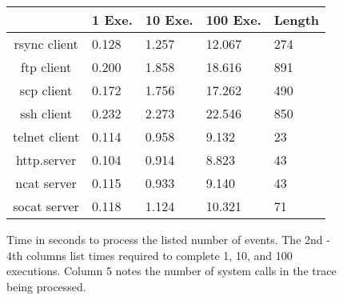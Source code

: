 \begin{figure}[t]
\centering
  \begin{tabular}{|c|l|l|l|l}
                & 1 Exe. & 10 Exe. & 100 Exe. & Length\\
              \hline
  rsync client  & 0.128       & 1.257         & 12.067         & 274 \\
  ftp client    & 0.200       & 1.858         & 18.616         & 891 \\
  scp client    & 0.172       & 1.756         & 17.262         & 490 \\
  ssh client    & 0.232       & 2.273         & 22.546         & 850 \\
  telnet client & 0.114       & 0.958         & 9.132          & 23  \\
  http.server   & 0.104       & 0.914         & 8.823          & 43  \\
  ncat server   & 0.115       & 0.933         & 9.140          & 43  \\
  socat server  & 0.118       & 1.124         & 10.321         & 71  \\
\end{tabular}
\caption{Time in seconds to process the listed number of events.  The 2nd - 4th
columns list times required to complete 1, 10, and 100 executions.  Column 5
notes the number of system calls in the trace being processed.}
\label{tbl:RealWorldPerformance}
\end{figure}

%

